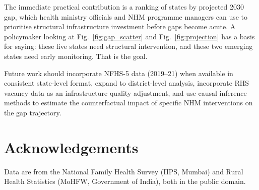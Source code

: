 \documentclass[conference]{IEEEtran}
\begin{document}
The immediate practical contribution is a ranking of states by
projected 2030 gap, which health ministry officials and NHM programme
managers can use to prioritise structural infrastructure investment
before gaps become acute. A policymaker looking at Fig.~\ref{fig:gap_scatter}
and Fig.~\ref{fig:projection} has a basis for saying: these five
states need structural intervention, and these two emerging states
need early monitoring. That is the goal.

Future work should incorporate NFHS-5 data (2019--21) when available
in consistent state-level format, expand to district-level analysis,
incorporate RHS vacancy data as an infrastructure quality adjustment,
and use causal inference methods to estimate the counterfactual impact
of specific NHM interventions on the gap trajectory.

\section*{Acknowledgements}
Data are from the National Family Health Survey (IIPS, Mumbai) and
Rural Health Statistics (MoHFW, Government of India), both in the
public domain.


\end{document}

